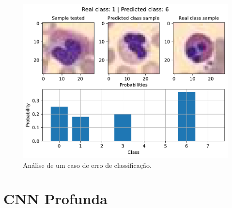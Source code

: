 \begin{figure}[H]
\centering
\includegraphics[width=0.75\linewidth]{../../plot/cnn_shallow/error_analyser_1516}
\caption{Análise de um caso de erro de classificação.}
\label{fig:error_analyser_1516}
\end{figure}

\clearpage
\section{CNN Profunda}

